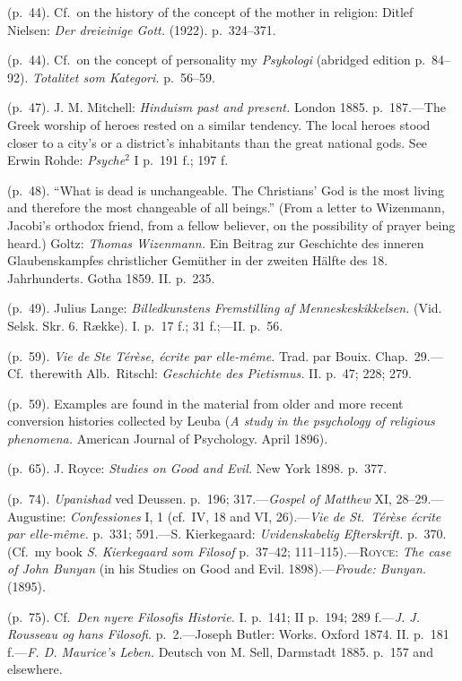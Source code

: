 \documentclass[12pt,a4paper]{book}
\newcommand{\opage}[1]{\marginnote{\footnotesize\textit{[#1]}}}
\begin{document}
 (p.~44). Cf.\ on the history of the concept of the mother in religion: Ditlef Nielsen: \emph{Der
dreieinige Gott.} (1922). p.~324--371.

 (p.~44). Cf.\ on the concept of personality my \emph{Psykologi} (abridged edition p.~84--92).
\emph{Totalitet som Kategori.} p.~56--59.

 (p.~47). J. M. Mitchell: \emph{Hinduism past and present.} London 1885. p.~187.---The Greek
worship of heroes rested on a similar tendency. The local heroes stood closer to a city's or a
district's inhabitants than the great national gods. See Erwin Rohde: \emph{Psyche}$^2$ I p.~191
f.; 197 f.

 (p.~48). ``What is dead is unchangeable. The Christians' God is the most living and therefore the
most changeable of all beings.'' (From a letter to Wizenmann, Jacobi's orthodox friend, from a
fellow believer, on the possibility of prayer 
\opage{248}being heard.) Goltz: \emph{Thomas Wizenmann.} Ein
Beitrag zur Geschichte des inneren Glaubenskampfes christlicher Gemüther in der zweiten Hälfte des
18. Jahrhunderts. Gotha 1859. II. p.~235.

 (p.~49). Julius Lange: \emph{Billedkunstens Fremstilling af Menneskeskikkelsen.} (Vid. Selsk.
Skr. 6. Række). I. p.~17 f.; 31 f.;---II. p.~56.

 (p.~59). \emph{Vie de Ste Térèse, écrite par elle-même.} Trad. par Bouix. Chap.~29.---Cf.\
therewith Alb.\ Ritschl: \emph{Geschichte des Pietismus.} II. p.~47; 228; 279.

 (p.~59). Examples are found in the material from older and more recent conversion histories
collected by Leuba (\emph{A study in the psychology of religious phenomena.} American Journal of
Psychology. April 1896).

 (p.~65). J. Royce: \emph{Studies on Good and Evil.} New York 1898. p.~377.

 (p.~74). \emph{Upanishad} ved Deussen. p.~196; 317.---\emph{Gospel of Matthew} XI, 28--29.---%
Augustine: \emph{Confessiones} I, 1 (cf.\ IV, 18 and VI, 26).---\emph{Vie de St.\ Térèse écrite par
elle-même.} p.~331; 591.---S. Kierkegaard: \emph{Uvidenskabelig Efterskrift.} p.~370. (Cf.\ my book
\emph{S. Kierkegaard som Filosof} p.~37--42; 111--115).---\textsc{Royce}: \emph{The case of John
Bunyan} (in his Studies on Good and Evil. 1898).---\emph{Froude: Bunyan.} (1895).

 (p.~75). Cf.\ \emph{Den nyere Filosofis Historie.} I. p.~141; II p.~194; 289 f.---\emph{J. J.
Rousseau og hans Filosofi.} p.~2.---Joseph Butler: Works. Oxford 1874. II. p.~181 f.---\emph{F. D.
Maurice's Leben.} Deutsch von M. Sell, Darmstadt 1885. p.~157 and elsewhere.
\end{document}
